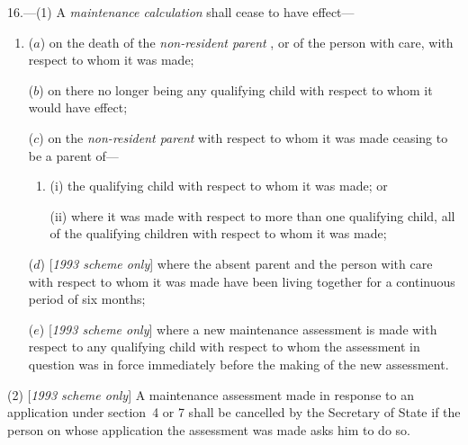 \documentclass[12pt,a4paper]{article}
\begin{document}
16.---(1) A 
\emph{maintenance calculation}  %
shall cease to have effect—
\begin{enumerate}\item[]
($a$) on the death of the 
\emph{non-resident parent}%
, or of the person with care, with respect to whom it was made;

($b$) on there no longer being any qualifying child with respect to whom it would have effect;

($c$) on the 
\emph{non-resident parent}  %
with respect to whom it was made ceasing to be a parent of—
\begin{enumerate}\item[]
(i) the qualifying child with respect to whom it was made; or

(ii) where it was made with respect to more than one qualifying child, all of the qualifying children with respect to whom it was made;
\end{enumerate}

($d$) [\emph{1993 scheme only}] where the absent parent and the person with care with respect to whom it was made have been living together for a continuous period of six months;

($e$) [\emph{1993 scheme only}] where a new maintenance assessment is made with respect to any qualifying child with respect to whom the assessment in question was in force immediately before the making of the new assessment.
\end{enumerate}

(2) [\emph{1993 scheme only}] A maintenance assessment made in response to an application under section~4 or 7 shall be cancelled by 
the Secretary of State  %
if the person on whose application the assessment was made asks him to do so.

%
\end{document}
